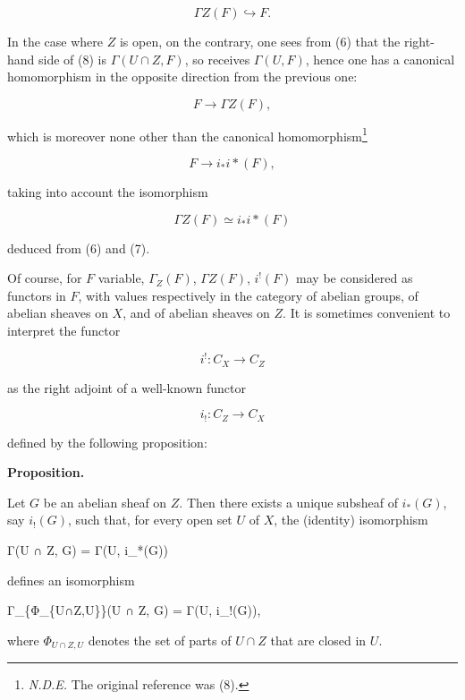 \documentclass[
  11pt,
  a4paper,
]{book}
\newenvironment{Shaded}{}{}
\newcommand{\NormalTok}[1]{#1}
\newcounter{none} %
\begin{document}
\[ \Gamma Z(F) \hookrightarrow F. \]

In the case where \(Z\) is open, on the contrary, one sees from (6) that
the right-hand side of (8) is \(\Gamma(U \cap Z,
F)\), so receives \(\Gamma(U, F)\), hence one has a canonical
homomorphism in the opposite direction from the previous one:

\[ F \longrightarrow \Gamma Z(F), \]

which is moreover none other than the canonical homomorphism\footnote{\emph{N.D.E.}
  The original reference was (8).}

\[ F \longrightarrow i_{*} i*(F), \]

taking into account the isomorphism

\[ \Gamma Z(F) \simeq i_{*} i*(F) \]

deduced from (6) and (7).

Of course, for \(F\) variable, \(\Gamma_{Z}(F)\), \(\Gamma Z(F)\),
\(i^{!}(F)\) may be considered as functors in \(F\), with values
respectively in the category of abelian groups, of abelian sheaves on
\(X\), and of abelian sheaves on \(Z\). It is sometimes convenient to
interpret the functor

\[ i^{!}: C_{X} \longrightarrow C_{Z} \]

as the right adjoint of a well-known functor

\[ i_{!}: C_{Z} \longrightarrow C_{X} \]

defined by the following proposition:

\textbf{Proposition.}

Let \(G\) be an abelian sheaf on \(Z\). Then there exists a unique
subsheaf of \(i_{*}(G)\), say \(i_{!}(G)\), such that, for every open
set \(U\) of \(X\), the (identity) isomorphism

\begin{Shaded}
\begin{Highlighting}[]
\NormalTok{Γ(U ∩ Z, G) = Γ(U, i\_*(G))}
\end{Highlighting}
\end{Shaded}

defines an isomorphism

\begin{Shaded}
\begin{Highlighting}[]
\NormalTok{Γ\_\{Φ\_\{U∩Z,U\}\}(U ∩ Z, G) = Γ(U, i\_!(G)),}
\end{Highlighting}
\end{Shaded}

where \(\Phi_{U\cap Z,U}\) denotes the set of parts of \(U \cap Z\) that
are closed in \(U\).
\end{document}
